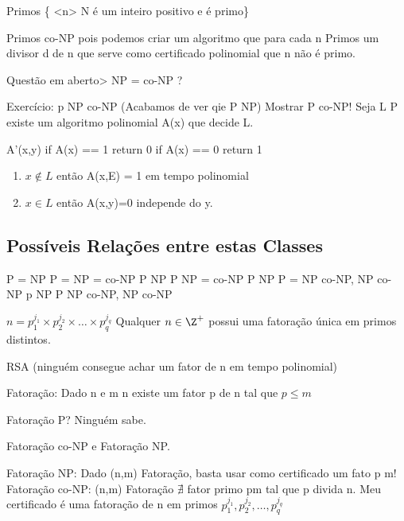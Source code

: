 \documentclass[a4paper,oneside,article,table]{article}
\begin{document}
        Primos \{ <n> N é um inteiro positivo e é primo\}

        Primos \in co-NP pois podemos criar um algoritmo que para cada n \neq Primos \rightarrow \exists um divisor d de n que serve como certificado polinomial que n não é primo.

        Questão em aberto> NP = co-NP ?

        Exercício: p \subseteq NP \cap co-NP (Acabamos de ver qie P \subseteq NP)
        Mostrar P \subseteq co-NP! Seja L \in P \rightarrow existe um algoritmo polinomial A(x) que decide L.

        A'(x,y)
            if A(x) == 1 return 0
            if A(x) == 0 return 1

        \begin{enumerate}
            \item $x \notin L$ então A(x,E) = 1 em tempo polinomial
            \item $x \in L$ então A(x,y)=0 independe do y.
        \end{enumerate}

        \subsection{Possíveis Relações entre estas Classes}

        P = NP \rightarrow P = NP = co-NP
        P \neq NP \rightarrow P \in NP = co-NP
        P \neq NP \rightarrow P = NP \bigcap co-NP, NP \neq co-NP
        p \neq NP \rightarrow P \subset NP \bigcap co-NP, NP \neq co-NP

        $n = p_{1}^{j_1} \times p_{2}^{j_2} \times \ldots \times p_{q}^{j_q}$
        Qualquer $n \in \Z^+$ possui uma fatoração única em primos distintos.

        RSA (ninguém consegue achar um fator de n em tempo polinomial)

        Fatoração: Dado n e m \leq n existe um fator p de n tal que $p \leq m$

        Fatoração \in P? Ninguém sabe.

        Fatoração \in co-NP e Fatoração \in NP.

        Fatoração \in NP: Dado (n,m) \in Fatoração, basta usar como certificado um fato p \leq m!
        Fatoração \in co-NP: (n,m) \notin Fatoração \rightarrow $\nexists$ fator primo p\leq m tal que p divida n. Meu certificado é uma fatoração de n em primos $p_{1}^{j_1}, p_{2}^{j_2}, \ldots, p_{q}^{j_q}$
\end{document}
